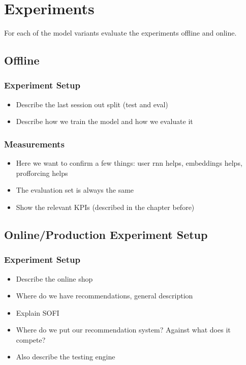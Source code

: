 \chapter{Experiments}
For each of the model variants evaluate the experiments offline and online.
\section{Offline}
\subsection{Experiment Setup}\label{exp_setup}
\begin{itemize}
    \item Describe the last session out split (test and eval)
    \item Describe how we train the model and how we evaluate it
\end{itemize}
\subsection{Measurements}
\begin{itemize}
    \item Here we want to confirm a few things: user rnn helps, embeddings helps, profforcing helps
    \item The evaluation set is always the same
    \item Show the relevant KPIs (described in the chapter before)
\end{itemize}

\section{Online/Production Experiment Setup}
\subsection{Experiment Setup}
\begin{itemize}
    \item Describe the online shop
    \item Where do we have recommendations, general description
    \item Explain SOFI
    \item Where do we put our recommendation system? Against what does it compete?
    \item Also describe the testing engine
\end{itemize}
